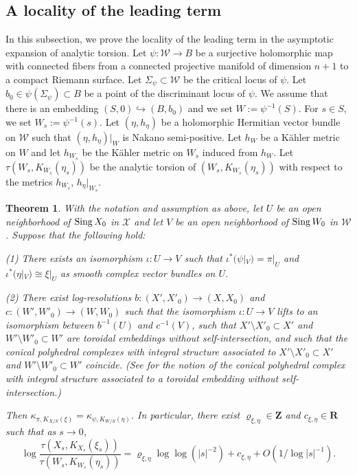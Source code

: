 \documentclass[amscd, leqno]{amsart}
\theoremstyle{plain}
\newtheorem{theorem}{Theorem}[section]
\theoremstyle{definition}
\theoremstyle{remark}
\begin{document}
\subsection
{A locality of the leading term}
\label{sect:7.2}
\par
In this subsection, we prove the locality of the leading term in the asymptotic expansion of analytic torsion.
Let $\psi \colon {\mathcal W} \to B$ be a surjective holomorphic map with connected fibers from a connected projective manifold 
of dimension $n+1$ to a compact Riemann surface. Let $\Sigma_{\psi} \subset {\mathcal W}$ be the critical locus of $\psi$.  
Let $b_{0} \in \psi(\Sigma_{\psi}) \subset B$ be a point of the discriminant locus of $\psi$. We assume that there is an embedding
$(S,0) \hookrightarrow (B,b_{0})$ and we set $W := \psi^{-1}(S)$. For $s\in S$, we set $W_{s} := \psi^{-1}(s)$. 
Let $(\eta, h_{\eta})$ be a holomorphic Hermitian vector bundle on ${\mathcal W}$ such that $(\eta, h_{\eta})|_{W}$ is Nakano semi-positive.
Let $h_{W}$ be a K\"ahler metric on $W$ and let $h_{W_{s}}$ be the K\"ahler metric on $W_{s}$ induced from $h_{W}$.
Let $\tau(W_{s}, K_{W_{s}}(\eta_{s}))$ be the analytic torsion of $(W_{s}, K_{W_{s}}(\eta_{s}))$ with respect to the metrics $h_{W_{s}}$,
$h_{\eta}|_{W_{s}}$.


\begin{theorem}
\label{thm:locality:sing:tors}
With the notation and assumption as above, let $U$ be an open neighborhood of ${\rm Sing}\,X_{0}$ in ${\mathcal X}$ and 
let $V$ be an open neighborhood of ${\rm Sing}\,W_{0}$ in ${\mathcal W}$. Suppose that the following hold:
\par{\rm (1)}
There exists an isomorphism $\iota \colon U \to V$ 
such that $\iota^{*}(\psi|_{V}) = \pi|_{U}$ and $\iota^{*}(\eta|_{V}) \cong \xi|_{U}$ as smooth complex vector bundles on $U$.  
\par{\rm (2)}
There exist log-resolutions $b \colon (X',X'_{0}) \to (X, X_{0})$ and $c \colon (W', W'_{0})\to (W, W_{0})$ such that the isomorphism
$\iota \colon U \to V$ lifts to an isomorphism between $b^{-1}(U)$ and $c^{-1}(V)$, 
such that $X'\setminus X'_{0} \subset X'$ and $W'\setminus W'_{0} \subset W'$ are toroidal embeddings without self-intersection, 
and such that the conical polyhedral complexes with integral structure associated to 
$X'\setminus X'_{0} \subset X'$ and $W'\setminus W'_{0} \subset W'$ coincide.
(See \cite[p.71]{Mumford73} for the notion of the conical polyhedral complex with integral structure associated to a toroidal embedding 
without self-intersection.)
\par
Then $\kappa_{\pi, K_{X/S}(\xi)} = \kappa_{\psi, K_{W/S}(\eta)}$.
In particular, there exist $\varrho_{\xi,\eta} \in {\mathbf Z}$ and $c_{\xi,\eta} \in {\mathbf R}$ such that as $s \to 0$,
$$
\log \frac{ \tau(X_{s}, K_{X_{s}}(\xi_{s})) }{ \tau(W_{s}, K_{W_{s}}(\eta_{s})) } 
= \varrho_{\xi,\eta} \log\log(|s|^{-2}) + c_{\xi,\eta} + O(1/\log |s|^{-1}).
$$
\end{theorem}
\end{document}
